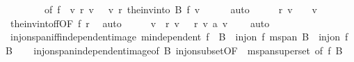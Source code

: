 \begin{isabellebody}
\ \ \ \ \ \ \ \ of\ {\isachardoublequoteopen}f\ {\isacharbackquote}{\kern0pt}\ {\isacharbraceleft}{\kern0pt}v{\isachardot}{\kern0pt}\ r\ v\ {\isasymnoteq}\ {}{\isacharbraceright}{\kern0pt}{\isachardoublequoteclose}\ {\isachardoublequoteopen}{\isasymlambda}v{\isachardot}{\kern0pt}\ r\ {\isacharparenleft}{\kern0pt}the{\isacharunderscore}{\kern0pt}inv{\isacharunderscore}{\kern0pt}into\ B\ f\ v{\isacharparenright}{\kern0pt}{\isachardoublequoteclose}{\isacharbrackright}{\kern0pt}\isanewline
\ \ \ \ \isamarkupfalse%
\ auto\isanewline
\ \ \isamarkupfalse%
\ \isamarkupfalse%
\ {\isachardoublequoteopen}r\ v\ {\isacharequal}{\kern0pt}\ {}{\isachardoublequoteclose}\ \ v\isanewline
\ \ \ \ \isamarkupfalse%
\ the{\isacharunderscore}{\kern0pt}inv{\isacharunderscore}{\kern0pt}into{\isacharunderscore}{\kern0pt}f{\isacharunderscore}{\kern0pt}f{\isacharbrackleft}{\kern0pt}OF\ f{\isacharbrackright}{\kern0pt}\ r\ \isamarkupfalse%
\ auto\isanewline
\ \ \isamarkupfalse%
\ \isamarkupfalse%
\ {\isachardoublequoteopen}{\isacharparenleft}{\kern0pt}{\isasymSum}v\ {\isacharbar}{\kern0pt}\ r\ v\ {\isasymnoteq}\ {}{\isachardot}{\kern0pt}\ r\ v\ {\isacharasterisk}{\kern0pt}a\ v{\isacharparenright}{\kern0pt}\ {\isacharequal}{\kern0pt}\ {}{\isachardoublequoteclose}\ \isamarkupfalse%
\ auto\isanewline
{}\isamarkupfalse%
%
\endisatagproof
{\isafoldproof}%
%
\isadelimproof
\isanewline
%
\endisadelimproof
\isanewline
{}\isamarkupfalse%
\ inj{\isacharunderscore}{\kern0pt}on{\isacharunderscore}{\kern0pt}span{\isacharunderscore}{\kern0pt}iff{\isacharunderscore}{\kern0pt}independent{\isacharunderscore}{\kern0pt}image{\isacharcolon}{\kern0pt}\ {\isachardoublequoteopen}m{}{\isachardot}{\kern0pt}independent\ {\isacharparenleft}{\kern0pt}f\ {\isacharbackquote}{\kern0pt}\ B{\isacharparenright}{\kern0pt}\ {\isasymLongrightarrow}\ inj{\isacharunderscore}{\kern0pt}on\ f\ {\isacharparenleft}{\kern0pt}m{}{\isachardot}{\kern0pt}span\ B{\isacharparenright}{\kern0pt}\ {\isasymlongleftrightarrow}\ inj{\isacharunderscore}{\kern0pt}on\ f\ B{\isachardoublequoteclose}\isanewline
%
\isadelimproof
\ \ %
\endisadelimproof
%
\isatagproof
{}\isamarkupfalse%
\ inj{\isacharunderscore}{\kern0pt}on{\isacharunderscore}{\kern0pt}span{\isacharunderscore}{\kern0pt}independent{\isacharunderscore}{\kern0pt}image{\isacharbrackleft}{\kern0pt}of\ B{\isacharbrackright}{\kern0pt}\ inj{\isacharunderscore}{\kern0pt}on{\isacharunderscore}{\kern0pt}subset{\isacharbrackleft}{\kern0pt}OF\ {\isacharunderscore}{\kern0pt}\ m{}{\isachardot}{\kern0pt}span{\isacharunderscore}{\kern0pt}superset{\isacharcomma}{\kern0pt}\ of\ f\ B{\isacharbrackright}{\kern0pt}\ \isamarkupfalse%

\end{isabellebody}
